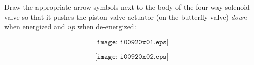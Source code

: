 

Draw the appropriate arrow symbols next to the body of the four-way solenoid valve so that it pushes the piston valve actuator (on the butterfly valve) {\it down} when energized and {\it up} when de-energized:

$$\texttt{[image: i00920x01.eps]}$$







$$\texttt{[image: i00920x02.eps]}$$










